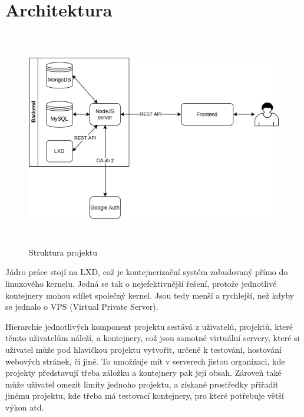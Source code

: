 \documentclass[a4paper,oneside,12pt]{report}
\begin{document}


\tableofcontents


\newpage



\setcounter{page}{1}

\chapter{Architektura}

\begin{figure}[h]
	\centering
	\includegraphics[height=9.5cm]{../img/architecture.png}
	\caption[Strukura projektu, vlastní tvorba]{Struktura projektu}
	\label{fig:architecture}
\end{figure}

Jádro práce stojí na LXD, což je kontejnerizační systém zabudovaný přímo do linuxového kernelu.
Jedná se tak o nejefektivnější řešení, protože jednotlivé kontejnery mohou sdílet společný kernel.
Jsou tedy menší a rychlejší, než kdyby se jednalo o VPS (Virtual Private Server).

Hierarchie jednotlivých komponent projektu sestává z uživatelů, projektů, které těmto uživatelům náleží, a kontejnery, což jsou samotné virtuální servery, které si uživatel může pod hlavičkou projektu vytvořit, určené k testování, hostování webových stránek, či jiné.
To umožňuje mít v serverech jistou organizaci, kde projekty představují třeba záložku a kontejnery pak její obsah.
Zároveň také může uživatel omezit limity jednoho projektu, a získané prostředky přiřadit jinému projektu, kde třeba má testovací kontejnery, pro které potřebuje větší výkon atd.
\end{document}
